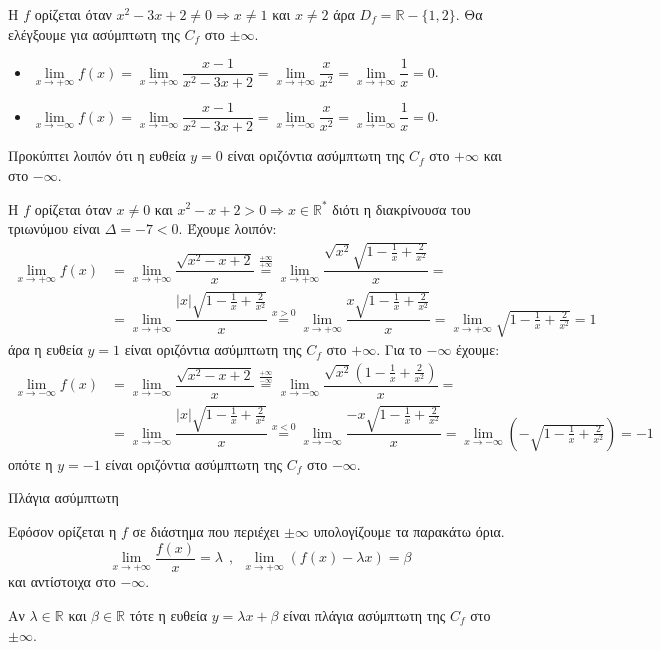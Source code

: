 \lysh\vspace{-5mm}
\begin{alist}
\item Η $f$ ορίζεται όταν $x^2-3x+2\neq 0\Rightarrow x\neq 1$ και $x\neq 2$ άρα $D_f=\mathbb{R}-\{1,2\}$. Θα ελέγξουμε για ασύμπτωτη της $C_f$ στο $\pm\infty$.
\begin{itemize}
\item $\lim\limits_{x\to +\infty}{f(x)}=\lim\limits_{x\to +\infty}{\dfrac{x-1}{x^2-3x+2}}=\lim\limits_{x\to +\infty}{\dfrac{x}{x^2}}=\lim\limits_{x\to +\infty}{\dfrac{1}{x}}=0$.
\item $\lim\limits_{x\to -\infty}{f(x)}=\lim\limits_{x\to -\infty}{\dfrac{x-1}{x^2-3x+2}}=\lim\limits_{x\to -\infty}{\dfrac{x}{x^2}}=\lim\limits_{x\to -\infty}{\dfrac{1}{x}}=0$.
\end{itemize}
Προκύπτει λοιπόν ότι η ευθεία $y=0$ είναι οριζόντια ασύμπτωτη της $C_f$ στο $+\infty$ και στο $-\infty$.
\item Η $f$ ορίζεται όταν $x\neq 0$ και $x^2-x+2>0\Rightarrow x\in\mathbb{R}^*$ διότι η διακρίνουσα του τριωνύμου είναι $\Delta=-7<0$. Έχουμε λοιπόν:
\begin{align*}
\lim\limits_{x\to +\infty}{f(x)}&=\lim\limits_{x\to +\infty}{\dfrac{\sqrt{x^2-x+2}}{x}}\stackrel{\frac{+\infty}{+\infty}}{=}\lim\limits_{x\to +\infty}{\dfrac{\sqrt{x^2}\sqrt{1-\frac{1}{x}+\frac{2}{x^2}}}{x}}=\\&=\lim\limits_{x\to +\infty}{\dfrac{|x|\sqrt{1-\frac{1}{x}+\frac{2}{x^2}}}{x}}\stackrel{x>0}{=}\lim\limits_{x\to +\infty}{\dfrac{x\sqrt{1-\frac{1}{x}+\frac{2}{x^2}}}{x}}=\lim\limits_{x\to +\infty}{\sqrt{1-\frac{1}{x}+\frac{2}{x^2}}}=1
\end{align*}
άρα η ευθεία $y=1$ είναι οριζόντια ασύμπτωτη της $C_f$ στο $+\infty$. Για το $-\infty$ έχουμε:
\begin{align*}
\lim\limits_{x\to -\infty}{f(x)}&=\lim\limits_{x\to -\infty}{\dfrac{\sqrt{x^2-x+2}}{x}}\stackrel{\frac{+\infty}{-\infty}}{=}\lim\limits_{x\to -\infty}{\dfrac{\sqrt{x^2}\left(1-\frac{1}{x}+\frac{2}{x^2}\right)}{x}}=\\&=\lim\limits_{x\to -\infty}{\dfrac{|x|\sqrt{1-\frac{1}{x}+\frac{2}{x^2}}}{x}}\stackrel{x<0}{=}\lim\limits_{x\to -\infty}{\dfrac{-x\sqrt{1-\frac{1}{x}+\frac{2}{x^2}}}{x}}=\lim\limits_{x\to -\infty}{\left(-\sqrt{1-\frac{1}{x}+\frac{2}{x^2}}\right)}=-1
\end{align*}
οπότε η $y=-1$ είναι οριζόντια ασύμπτωτη της $C_f$ στο $-\infty$.
\end{alist}
\begin{askhsh}{Πλάγια ασύμπτωτη}
\bhmata\begin{bhma}
\item Εφόσον ορίζεται η $ f $ σε διάστημα που περιέχει $ \pm\infty $ υπολογίζουμε τα παρακάτω όρια.
\[ \lim\limits_{x\to +\infty}{\frac{f(x)}{x}}=\lambda\ \ ,\ \ \lim\limits_{x\to +\infty}{(f(x)-\lambda x)}=\beta \]
και αντίστοιχα στο $ -\infty $.
\item Αν $ \lambda\in\mathbb{R} $ και $ \beta\in\mathbb{R} $ τότε η ευθεία $ y=\lambda x+\beta $ είναι πλάγια ασύμπτωτη της $ C_f $ στο $ \pm\infty $.
\end{bhma}
\end{askhsh}

